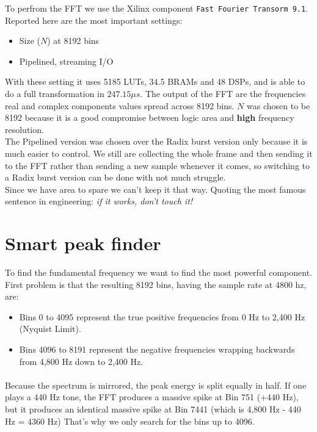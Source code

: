 To perfrom the FFT we use the Xilinx component \texttt{Fast Fourier Transorm 9.1}. Reported here are 
the most important settings:
\begin{itemize}
    \item Size ($N$) at 8192 bins 
    \item Pipelined, streaming I/O
\end{itemize}
With these setting it uses 5185 LUTs, 34.5 BRAMs and 48 DSPs, and is able to do a full transformation in $247.15 \mu s$.
The output of the FFT are the frequencies real and complex components values spread across 8192 bins. 
$N$ was chosen to be 8192 because it is a good compromise between logic area and \textbf{high} frequency resolution.\\
The Pipelined version was chosen over the Radix burst version only because it is much easier to control. We still are collecting
the whole frame and then sending it to the FFT rather than sending a new sample whenever it comes, so switching to a Radix burst
version can be done with not much struggle.\\
Since we have area to spare we can't keep it that way. Quoting the most famous sentence in engineering: \textit{if it works, don't touch it!}

\section{Smart peak finder}

To find the fundamental frequency we want to find the most powerful component.
First problem is that the resulting 8192 bins, having the sample rate at 4800 hz, are:
\begin{itemize}
    \item Bins 0 to 4095 represent the true positive frequencies from 0 Hz to 2,400 Hz (Nyquist Limit).
    \item Bins 4096 to 8191 represent the negative frequencies wrapping backwards from 4,800 Hz down to 2,400 Hz.
\end{itemize}
\paragraph{}
Because the spectrum is mirrored, the peak energy is split equally in half.
If one plays a 440 Hz tone, the FFT produces a massive spike at Bin 751 (+440 Hz),
but it produces an identical massive spike at Bin 7441 (which is 4,800 Hz - 440 Hz = 4360 Hz)
That's why we only search for the bins up to 4096.

